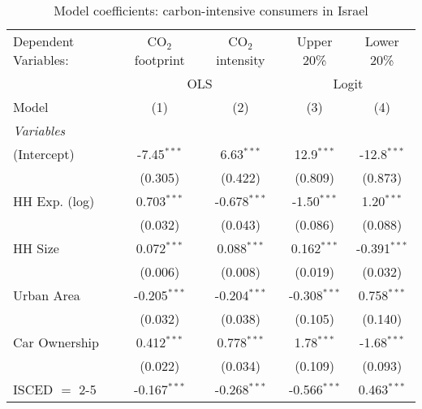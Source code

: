 
\begin{table}[htbp!]
   \centering
   \small
   \begin{adjustbox}{width = 1\textwidth, max height = 0.95\textheight, center}
      \begin{threeparttable}[b]
         \caption{\label{tab:Logit_1_ISR} Model coefficients: carbon-intensive consumers in Israel}
         \begin{tabular}{lcccc}
            \tabularnewline \midrule \midrule
            Dependent Variables: & CO$_{2}$ footprint & CO$_{2}$ intensity & Upper 20\%     & Lower 20\%\\   
             & \multicolumn{2}{c}{OLS} & \multicolumn{2}{c}{Logit} \\ 
            Model                & (1)                & (2)                & (3)            & (4)\\  
            \midrule
            \emph{Variables}\\
            (Intercept)          & -7.45$^{***}$      & 6.63$^{***}$       & 12.9$^{***}$   & -12.8$^{***}$\\   
                                 & (0.305)            & (0.422)            & (0.809)        & (0.873)\\   
            HH Exp. (log)        & 0.703$^{***}$      & -0.678$^{***}$     & -1.50$^{***}$  & 1.20$^{***}$\\   
                                 & (0.032)            & (0.043)            & (0.086)        & (0.088)\\   
            HH Size              & 0.072$^{***}$      & 0.088$^{***}$      & 0.162$^{***}$  & -0.391$^{***}$\\   
                                 & (0.006)            & (0.008)            & (0.019)        & (0.032)\\   
            Urban Area           & -0.205$^{***}$     & -0.204$^{***}$     & -0.308$^{***}$ & 0.758$^{***}$\\   
                                 & (0.032)            & (0.038)            & (0.105)        & (0.140)\\   
            Car Ownership        & 0.412$^{***}$      & 0.778$^{***}$      & 1.78$^{***}$   & -1.68$^{***}$\\   
                                 & (0.022)            & (0.034)            & (0.109)        & (0.093)\\   
            ISCED $=$ 2-5        & -0.167$^{***}$     & -0.268$^{***}$     & -0.566$^{***}$ & 0.463$^{***}$\\   

\end{tabular}
\end{threeparttable}
\end{adjustbox}
\end{table}
